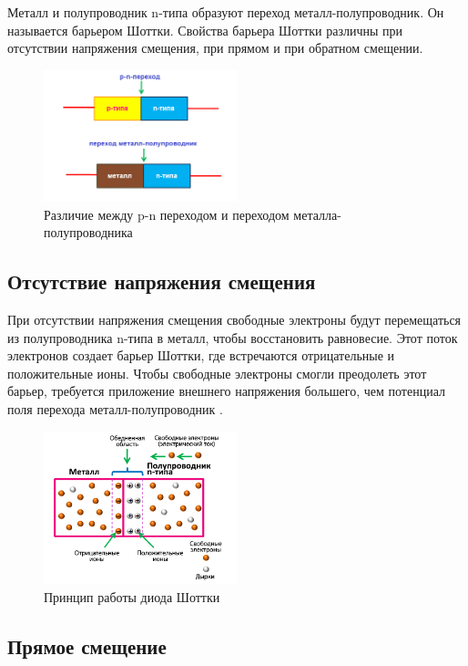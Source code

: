 \documentclass[spec, och, referat]{shiza}
\begin{document}
Металл и полупроводник n-типа образуют переход металл-полупроводник. Он называется барьером Шоттки. 
Свойства барьера Шоттки различны при отсутствии напряжения смещения, при прямом и при обратном смещении.

\begin{figure}[H]
  \centering
  \includegraphics[width=0.5\textwidth]{photo/2.png}
  \caption{Различие между p-n переходом и переходом металла-полупроводника}
\end{figure}

\subsection{Отсутствие напряжения смещения}

При отсутствии напряжения смещения свободные электроны будут перемещаться из полупроводника n-типа в металл, чтобы восстановить равновесие.
Этот поток электронов создает барьер Шоттки, где встречаются отрицательные и положительные ионы. Чтобы свободные электроны смогли преодолеть 
этот барьер, требуется приложение внешнего напряжения большего, чем потенциал поля перехода металл-полупроводник \cite{2}.

\begin{figure}[H]
  \centering
  \includegraphics[width=0.5\textwidth]{photo/3.png}
  \caption{Принцип работы диода Шоттки}
\end{figure}

\subsection{Прямое смещение}
\end{document}
